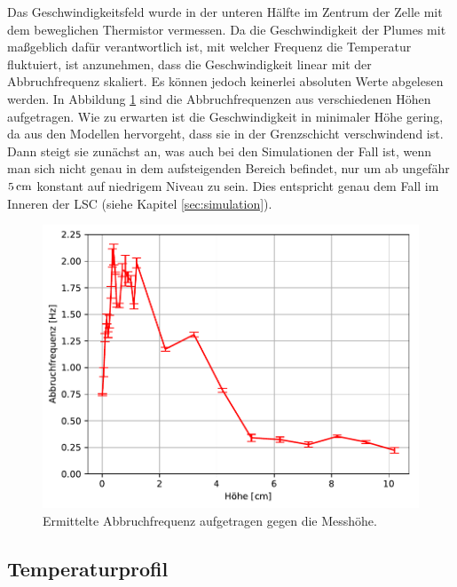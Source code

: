 \documentclass[12pt,a4paper,titlepage,headinclude]{scrartcl}
\numberwithin{equation}{subsection}
\begin{document}
Das Geschwindigkeitsfeld wurde in der unteren Hälfte im Zentrum der Zelle mit dem beweglichen Thermistor vermessen.
Da die Geschwindigkeit der Plumes mit maßgeblich dafür verantwortlich ist, mit welcher Frequenz die Temperatur fluktuiert, ist anzunehmen, dass die Geschwindigkeit linear mit der Abbruchfrequenz skaliert.
Es können jedoch keinerlei absoluten Werte abgelesen werden. 
In Abbildung \ref{fig:abbruchhoehe} sind die Abbruchfrequenzen aus verschiedenen Höhen aufgetragen.
Wie zu erwarten ist die Geschwindigkeit in minimaler Höhe gering, da aus den Modellen hervorgeht, dass sie in der Grenzschicht verschwindend ist.
Dann steigt sie zunächst an, was auch bei den Simulationen der Fall ist, wenn man sich nicht genau in dem aufsteigenden Bereich befindet, nur um ab ungefähr $\SI5{\centi\meter}$ konstant auf niedrigem Niveau zu sein.
Dies entspricht genau dem Fall im Inneren der LSC (siehe Kapitel \ref{sec:simulation}).

\begin{figure}[h]
	\centering
	\includegraphics[width=0.7\linewidth]{abbruch_result}
	\caption{Ermittelte Abbruchfrequenz aufgetragen gegen die Messhöhe.}
	\label{fig:abbruchhoehe}
\end{figure}



\subsection{Temperaturprofil}
\label{sec:profile}
\end{document}
